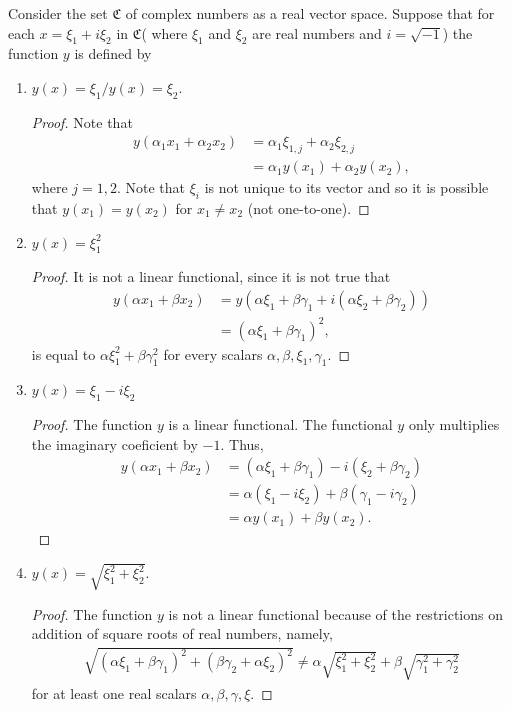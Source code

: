 \documentclass[12pt]{article}
\newenvironment{problem}[2][Problem]{\begin{trivlist} \item[\hskip \labelsep {\bfseries #1}\hskip \labelsep {\bfseries #2.}]}{\end{trivlist}}
\begin{document}
\begin{problem}{1}
  Consider the set $\mathfrak{C}$ of complex numbers as a real vector space. Suppose that for each $x=\xi_{1} + i\xi_{2}$ in $\mathfrak{C}$( where $\xi_{1}$ and $\xi_{2}$ are real numbers and $i=\sqrt{-1}$) the function $y$ is defined by
\begin{enumerate}
  \item $y(x) = \xi_{1}/y(x) = \xi_{2}$.
\begin{proof}
  Note that
\begin{align*}
  y(\alpha_{1}x_{1} + \alpha_{2}x_{2}) &= \alpha_{1}\xi_{1,j} + \alpha_{2}\xi_{2,j}\\
  &= \alpha_{1}y(x_{1}) + \alpha_{2}y(x_{2}),
\end{align*}
where $j=1,2$. Note that $\xi_{i}$ is not unique to its vector and so it is possible that $y(x_{1}) = y(x_{2})$ for $x_{1}\neq x_{2}$ (not one-to-one).
\end{proof}
\item $y(x)=\xi_{1}^{2}$
\begin{proof}
  It is not a linear functional, since it is not true that
\begin{align*}
  y(\alpha x_{1} + \beta x_{2}) &= y(\alpha \xi_{1} + \beta \gamma_{1} + i(\alpha \xi_{2} + \beta \gamma_{2}))\\
  &= (\alpha \xi_{1} + \beta \gamma_{1})^{2}, 
  \end{align*}
  is equal to $\alpha \xi_{1}^{2} + \beta \gamma_{1}^{2}$ for every scalars $\alpha,\beta,\xi_{1},\gamma_{1}$. 
\end{proof}
\item $y(x) = \xi_{1} - i\xi_{2}$
\begin{proof}
  The function $y$ is a linear functional. The functional $y$ only multiplies the imaginary coeficient by $-1$. Thus,
\begin{align*}
  y(\alpha x_{1} + \beta x_{2}) &= (\alpha \xi_{1} + \beta \gamma_{1}) - i(\xi_{2} + \beta \gamma_{2})\\
  &= \alpha(\xi_{1}-i\xi_{2}) + \beta(\gamma_{1}-i\gamma_{2})\\
  &= \alpha y(x_{1}) + \beta y(x_{2}).
\end{align*}
\end{proof}
\item $y(x) = \sqrt{\xi_{1}^{2} +\xi_{2}^{2}}$. 
\begin{proof}
  The function $y$ is not a linear functional because of the restrictions on addition of square roots of real numbers, namely,
\begin{align*}
  \sqrt{(\alpha \xi_{1} + \beta \gamma_{1})^{2} + (\beta \gamma_{2} + \alpha \xi_{2})^{2}} \neq \alpha \sqrt{\xi_{1}^{2}+\xi_{2}^{2}} + \beta \sqrt{\gamma_{1}^{2}+\gamma_{2}^{2}}
\end{align*}
for at least one real scalars $\alpha,\beta,\gamma,\xi$.
\end{proof}
\end{enumerate}
\end{problem}
\end{document}
